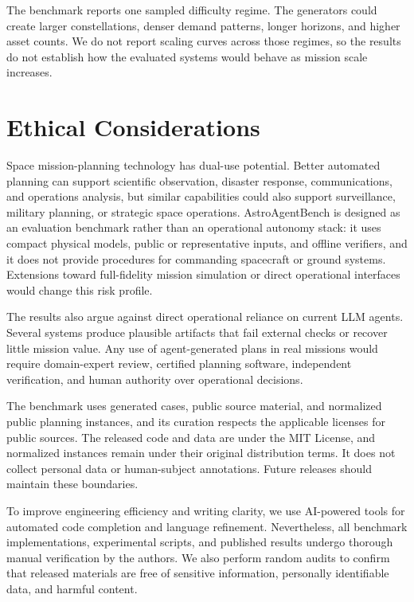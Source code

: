 \documentclass[11pt]{article}
\begin{document}
The benchmark reports one sampled difficulty regime. The generators could create larger constellations, denser demand patterns, longer horizons, and higher asset counts. We do not report scaling curves across those regimes, so the results do not establish how the evaluated systems would behave as mission scale increases.

\section*{Ethical Considerations}

Space mission-planning technology has dual-use potential. Better automated planning can support scientific observation, disaster response, communications, and operations analysis, but similar capabilities could also support surveillance, military planning, or strategic space operations. AstroAgentBench is designed as an evaluation benchmark rather than an operational autonomy stack: it uses compact physical models, public or representative inputs, and offline verifiers, and it does not provide procedures for commanding spacecraft or ground systems. Extensions toward full-fidelity mission simulation or direct operational interfaces would change this risk profile.

The results also argue against direct operational reliance on current LLM agents. Several systems produce plausible artifacts that fail external checks or recover little mission value. Any use of agent-generated plans in real missions would require domain-expert review, certified planning software, independent verification, and human authority over operational decisions.

The benchmark uses generated cases, public source material, and normalized public planning instances, and its curation respects the applicable licenses for public sources. The released code and data are under the MIT License, and normalized instances remain under their original distribution terms. It does not collect personal data or human-subject annotations. Future releases should maintain these boundaries.

To improve engineering efficiency and writing clarity, we use AI-powered tools for automated code completion and language refinement. Nevertheless, all benchmark implementations, experimental scripts, and published results undergo thorough manual verification by the authors. We also perform random audits to confirm that released materials are free of sensitive information, personally identifiable data, and harmful content.
\end{document}
